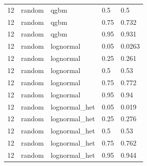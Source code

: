 \begin{tabular}{lllll}
12 & random & qgbm & 0.5 & 0.5 \\
12 & random & qgbm & 0.75 & 0.732 \\
12 & random & qgbm & 0.95 & 0.931 \\
12 & random & lognormal & 0.05 & 0.0263 \\
12 & random & lognormal & 0.25 & 0.261 \\
12 & random & lognormal & 0.5 & 0.53 \\
12 & random & lognormal & 0.75 & 0.772 \\
12 & random & lognormal & 0.95 & 0.94 \\
12 & random & lognormal\_het & 0.05 & 0.019 \\
12 & random & lognormal\_het & 0.25 & 0.276 \\
12 & random & lognormal\_het & 0.5 & 0.53 \\
12 & random & lognormal\_het & 0.75 & 0.762 \\
12 & random & lognormal\_het & 0.95 & 0.944 \\
\bottomrule
\end{tabular}